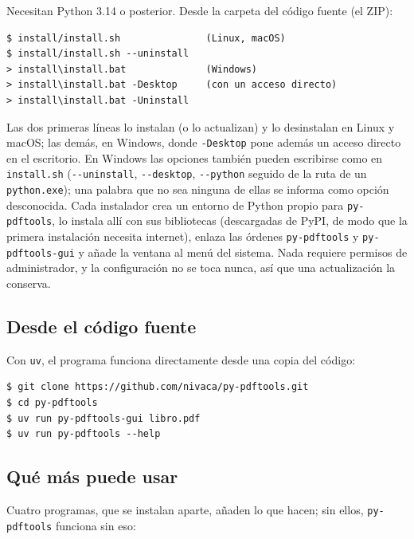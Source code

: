 \documentclass[12pt,
              article,
              oneside
              ]{memoir}
\begin{document}
Necesitan Python 3.14 o posterior. Desde la carpeta del código fuente (el
ZIP):

\begin{verbatim}
$ install/install.sh               (Linux, macOS)
$ install/install.sh --uninstall
> install\install.bat              (Windows)
> install\install.bat -Desktop     (con un acceso directo)
> install\install.bat -Uninstall
\end{verbatim}

\noindent{}%
Las dos primeras líneas lo instalan (o lo actualizan) y lo
desinstalan en Linux y macOS; las demás, en Windows, donde
\texttt{-Desktop} pone además un acceso directo en el escritorio. En
Windows las opciones también pueden escribirse como en \texttt{install.sh}
(\texttt{-{}-uninstall}, \texttt{-{}-desktop}, \texttt{-{}-python} seguido
de la ruta de un \texttt{python.exe}); una palabra que no sea ninguna de
ellas se informa como opción desconocida. Cada
instalador crea un entorno de Python propio para \texttt{py-pdftools}, lo
instala allí con sus bibliotecas (descargadas de PyPI, de modo que la
primera instalación necesita internet), enlaza las órdenes
\texttt{py-pdftools} y \texttt{py-pdftools-gui} y añade la ventana al menú
del sistema. Nada requiere permisos de administrador, y la configuración no
se toca nunca, así que una actualización la conserva.

\subsection{Desde el código fuente}

%
Con \texttt{uv}, el programa funciona directamente desde una copia del
código:

\begin{verbatim}
$ git clone https://github.com/nivaca/py-pdftools.git
$ cd py-pdftools
$ uv run py-pdftools-gui libro.pdf
$ uv run py-pdftools --help
\end{verbatim}

\subsection{Qué más puede usar}

Cuatro programas, que se instalan aparte, añaden lo que hacen; sin ellos,
\texttt{py-pdftools} funciona sin eso:
\end{document}
